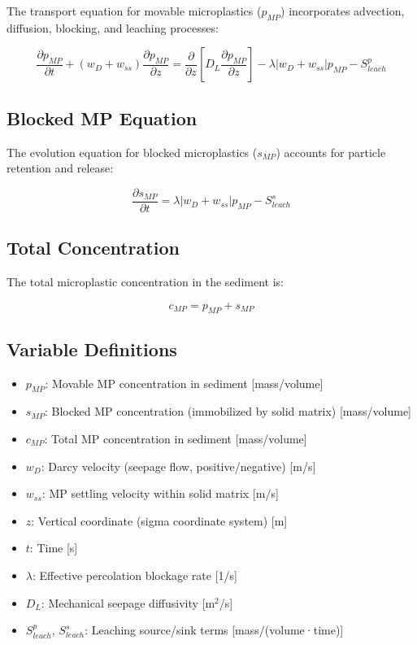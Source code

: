 \documentclass[11pt,a4paper]{article}
\begin{document}
The transport equation for movable microplastics ($p_{MP}$) incorporates advection, diffusion, blocking, and leaching processes:

\begin{equation}
\boxed{
\frac{\partial p_{MP}}{\partial t} + (w_D + w_{ss}) \frac{\partial p_{MP}}{\partial z} = \frac{\partial}{\partial z}\left[D_L \frac{\partial p_{MP}}{\partial z}\right] - \lambda|w_D + w_{ss}|p_{MP} - S_{leach}^p
}
\end{equation}

\subsection{Blocked MP Equation}

The evolution equation for blocked microplastics ($s_{MP}$) accounts for particle retention and release:

\begin{equation}
\boxed{
\frac{\partial s_{MP}}{\partial t} = \lambda|w_D + w_{ss}|p_{MP} - S_{leach}^s
}
\end{equation}

\subsection{Total Concentration}

The total microplastic concentration in the sediment is:

\begin{equation}
\boxed{
c_{MP} = p_{MP} + s_{MP}
}
\end{equation}

\subsection{Variable Definitions}

\begin{itemize}
    \item $p_{MP}$: Movable MP concentration in sediment [mass/volume]
    \item $s_{MP}$: Blocked MP concentration (immobilized by solid matrix) [mass/volume]
    \item $c_{MP}$: Total MP concentration in sediment [mass/volume]
    \item $w_D$: Darcy velocity (seepage flow, positive/negative) [m/s]
    \item $w_{ss}$: MP settling velocity within solid matrix [m/s]
    \item $z$: Vertical coordinate (sigma coordinate system) [m]
    \item $t$: Time [s]
    \item $\lambda$: Effective percolation blockage rate [1/s]
    \item $D_L$: Mechanical seepage diffusivity [m$^2$/s]
    \item $S_{leach}^p$, $S_{leach}^s$: Leaching source/sink terms [mass/(volume·time)]
\end{itemize}
\end{document}

